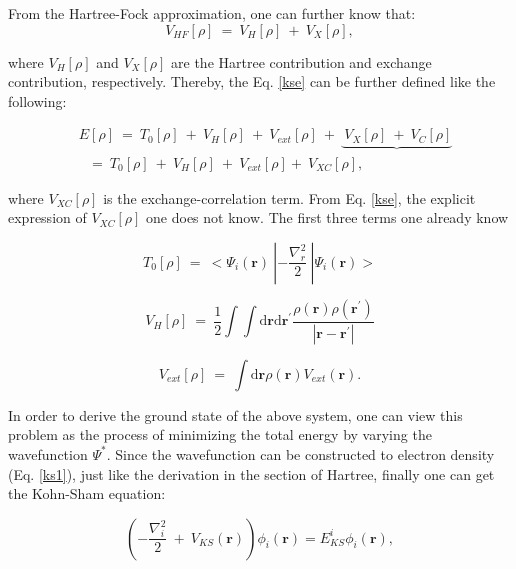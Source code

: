 \documentclass[a4paper, 12pt, titlepage,oneside,drop]{kthesis}
\begin{document}
From the Hartree-Fock approximation, one can further know that:
\begin{equation}
 V_\textit{HF}[\rho] \ = \ V_\textit{H}[\rho] \ + \ V_\textit{X}[\rho], 
\end{equation}

where $V_\textit{H}[\rho]$ and $ V_\textit{X}[\rho] $ are the Hartree contribution and exchange contribution, respectively. Thereby, the Eq. \ref{kse} can be further defined like
 the following:

\begin{equation}\label{ccc}
\begin{split}
&E[\rho]\ = \ T_{0}[\rho] \ + \ V_\textit{H}[\rho] \ + \ V_\textit{ext}[\rho] \ + \ \underbrace{\ V_\textit{X}[\rho]  \ + \ V_\textit{C}[\rho]}  \\
&\ \ \ = \ T_{0}[\rho] \ + \ V_\textit{H}[\rho] \ + \ V_\textit{ext}[\rho] + \ V_\textit{XC}[\rho],
\end{split}\end{equation}

where $V_\textit{XC}[\rho]$  is the exchange-correlation term. From Eq. \ref{kse}, the explicit expression of $V_\textit{XC}[\rho]$ one does not know. 
The first three terms one already know

\begin{equation}
 T_{0}[\rho]\ = \ < \Psi_{i}(\textbf{r}) \ | -\frac{\nabla^{2}_{r}}{2} \ | \Psi_{i}(\textbf{r}) >
\end{equation}

\begin{equation}
V_\textit{H}[\rho] \ = \ \frac{1}{2} \int \int \mathrm{d} {\textbf{r}} \mathrm{d}{\textbf{r}^{\prime}} \frac{\rho({\textbf{r}})\rho(\textbf{r}^{\prime})}{|{\textbf{r}}-{\textbf{r}}^{\prime}|}
\end{equation}

\begin{equation}
V_\textit{ext}[\rho]\ = \ \int \mathrm{d}{\textbf{r}} \rho(\textbf{r}) V_\textit{ext}(\textbf{r}). 
\end{equation}

In order to derive the ground state of the above system, one can view this problem as the process of minimizing the total energy by varying the wavefunction $\Psi^*$. Since
 the wavefunction can be constructed to electron density (Eq. \ref{ks1}), just like the derivation in the section of Hartree, finally one can get the Kohn-Sham equation:

\begin{equation}\label{aaa}
 (-\frac{\nabla^{2}_{i}}{2}\ + \ V_\textit{KS}(\textbf{r})) \phi_{\textit{i}}(\textbf{r}) = E_{\textit{KS}}^{\textit{i}} \phi_{\textit{i}}(\textbf{r}),
\end{equation}
\end{document}

